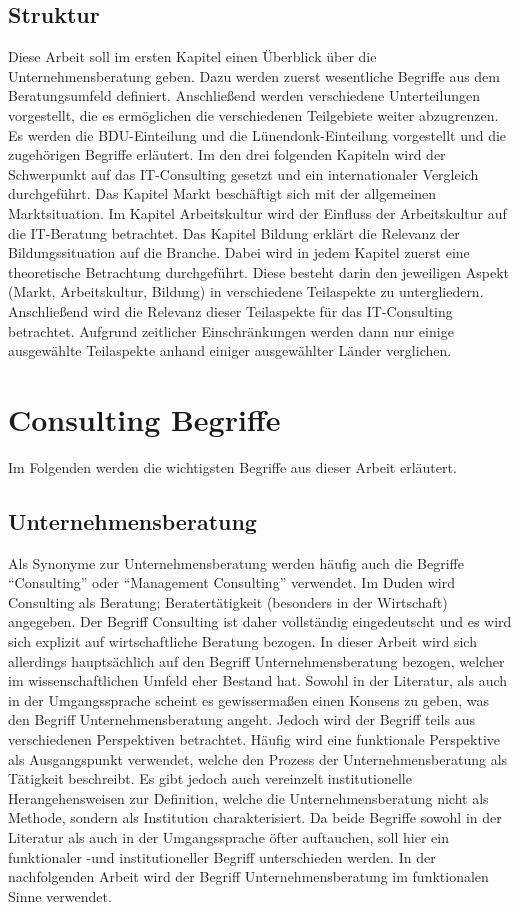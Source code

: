 \subsection*{Struktur}
Diese Arbeit soll im ersten Kapitel einen Überblick über die Unternehmensberatung geben. Dazu werden zuerst wesentliche Begriffe aus dem Beratungsumfeld definiert. Anschließend werden verschiedene Unterteilungen vorgestellt, die es ermöglichen die verschiedenen Teilgebiete weiter abzugrenzen. Es werden die BDU-Einteilung und die Lünendonk-Einteilung vorgestellt und die zugehörigen Begriffe erläutert.
Im den drei folgenden Kapiteln wird der Schwerpunkt auf das IT-Consulting gesetzt und ein internationaler Vergleich durchgeführt. Das Kapitel Markt beschäftigt sich mit der allgemeinen Marktsituation. Im Kapitel Arbeitskultur wird der Einfluss der Arbeitskultur auf die IT-Beratung betrachtet. Das Kapitel Bildung erklärt die Relevanz der Bildungssituation auf die Branche. Dabei wird in jedem Kapitel zuerst eine theoretische Betrachtung durchgeführt. Diese besteht darin den jeweiligen Aspekt (Markt, Arbeitskultur, Bildung) in verschiedene Teilaspekte zu untergliedern. Anschließend wird die Relevanz dieser Teilaspekte für das IT-Consulting betrachtet. Aufgrund zeitlicher Einschränkungen werden dann nur einige ausgewählte Teilaspekte anhand einiger ausgewählter Länder verglichen. 

\section{Consulting Begriffe}
Im Folgenden werden die wichtigsten Begriffe aus dieser Arbeit erläutert.
\subsection*{Unternehmensberatung}
Als Synonyme zur Unternehmensberatung werden häufig auch die Begriffe “Consulting”
oder “Management Consulting” verwendet. Im Duden wird Consulting als Beratung; Beratertätigkeit (besonders in der Wirtschaft) angegeben. Der Begriff Consulting ist daher vollständig eingedeutscht und es wird sich explizit auf wirtschaftliche Beratung bezogen. 
In dieser Arbeit wird sich allerdings hauptsächlich auf den Begriff Unternehmensberatung bezogen, welcher im wissenschaftlichen Umfeld eher Bestand hat.
Sowohl in der Literatur, als auch in der Umgangssprache scheint es gewissermaßen einen Konsens zu geben, was den Begriff Unternehmensberatung angeht. 
Jedoch wird der Begriff teils aus verschiedenen Perspektiven betrachtet. Häufig wird eine funktionale Perspektive als Ausgangspunkt verwendet, welche den Prozess der Unternehmensberatung als Tätigkeit beschreibt. Es gibt jedoch auch vereinzelt institutionelle Herangehensweisen zur Definition, welche die Unternehmensberatung nicht als Methode, sondern als Institution charakterisiert. Da beide Begriffe sowohl in der Literatur als auch in der Umgangssprache öfter auftauchen, soll hier ein funktionaler -und institutioneller Begriff unterschieden werden. In der nachfolgenden Arbeit wird der Begriff Unternehmensberatung im funktionalen Sinne verwendet.

